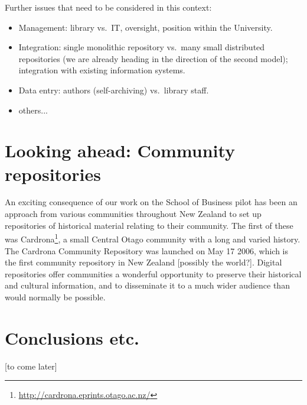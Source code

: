 \documentclass[12pt,pdftex,a4paper,titlepage]{article}
\begin{document}
Further issues that need to be considered in this context:


\begin{itemize}

	\item Management: library vs.\ IT, oversight, position within the University.

	\item Integration: single monolithic repository vs.\ many small distributed repositories (we are already heading in the direction of the second model); integration with existing information systems.

	\item Data entry: authors (self-archiving) vs.\ library staff.

	\item others...

\end{itemize}


\section{Looking ahead: Community repositories}

An exciting consequence of our work on the School of Business pilot has been an approach from various communities throughout New Zealand to set up repositories of historical material relating to their community. The first of these was Cardrona\footnote{\url{http://cardrona.eprints.otago.ac.nz/}}, a small Central Otago community with a long and varied history. The Cardrona Community Repository was launched on May 17 2006, which is the first community repository in New Zealand [possibly the world?]. Digital repositories offer communities a wonderful opportunity to preserve their historical and cultural information, and to disseminate it to a much wider audience than would normally be possible.


\section{Conclusions etc.}

[to come later]



\end{document}
